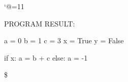 \let\e\expandafter
\catcode`@=11

\def\@pytexError#1{%
	\errmessage{#1}%
}









\def\@pytexChar@Backslash{\loggingall\@pytexParser@parse}
\let\@pytexChar@Dollar\bye


%

PROGRAM RESULT:

\@pytexCatcodes@setallactive

a = 0
b = 1
c = 3
x = True
y = False

if x:
	a = b + c
else:
	a = -1


\$
\bye
